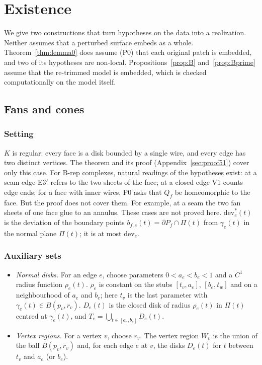 \documentclass[preprint,12pt]{elsarticle}
\theoremstyle{definition}
\theoremstyle{remark}
\begin{document}
\section{Existence}\label{sec:existence}

We give two constructions that turn hypotheses on the data into a realization. Neither assumes that a perturbed
surface embeds as a whole. Theorem~\ref{thm:lemma0} does assume (P0) that each original patch is embedded, and two
of its hypotheses are non-local. Propositions~\ref{prop:B} and~\ref{prop:Bprime} assume that the re-trimmed model is
embedded, which is checked computationally on the model itself.

\subsection{Fans and cones}\label{sec:fans}

\subsubsection*{Setting}
$K$ is regular: every face is a disk bounded by a single wire, and every edge has two distinct vertices. The theorem
and its proof (Appendix~\ref{sec:proof51}) cover only this case. For B-rep complexes, natural readings of the
hypotheses exist: at a seam edge E3$'$ refers to the two sheets of the face; at a closed edge V1 counts edge ends; for
a face with inner wires, P0 asks that $Q_f$ be homeomorphic to the face. But the proof does not cover them. For
example, at a seam the two fan sheets of one face glue to an annulus. These cases are not proved here.
$\mathrm{dev}^*_e(t)$ is the deviation of the boundary points $b_{f,e}(t)=\partial P_f\cap\Pi(t)$ from $\gamma_e(t)$ in
the normal plane $\Pi(t)$; it is at most $\mathrm{dev}_e$.

\subsubsection*{Auxiliary sets}
\begin{itemize}
\item \emph{Normal disks.} For an edge $e$, choose parameters $0<a_e<b_e<1$ and a $C^1$ radius function $\rho_e(t)$.
$\rho_e$ is constant on the stubs $[t_v,a_e]$, $[b_e,t_w]$ and on a neighbourhood of $a_e$ and $b_e$; here $t_v$ is
the last parameter with $\gamma_e(t)\in B(p_v,r_v)$. $D_e(t)$ is the closed disk of radius $\rho_e(t)$ in $\Pi(t)$
centred at $\gamma_e(t)$, and $T_e=\bigcup_{t\in[a_e,b_e]}D_e(t)$.
\item \emph{Vertex regions.} For a vertex $v$, choose $r_v$. The vertex region $W_v$ is the union of the ball
$B(p_v,r_v)$ and, for each edge $e$ at $v$, the disks $D_e(t)$ for $t$ between $t_v$ and $a_e$ (or $b_e$).
\end{itemize}
\end{document}
